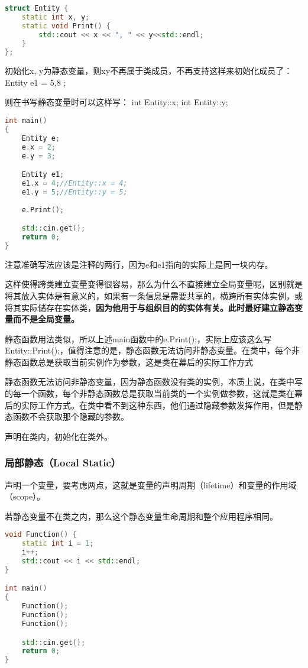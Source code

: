 \begin{lstlisting}[language=c++]
struct Entity {
    static int x, y;
    static void Print() {
        std::cout << x << ", " << y<<std::endl;
    }
};
\end{lstlisting}

初始化{\ncodestyle x}, {\ncodestyle y}为静态变量，则xy不再属于类成员，不再支持这样来初始化成员了：{\ncodestyle Entity e1 = { 5,8 };}

则在书写静态变量时可以这样写：
int Entity::x;
int Entity::y;


\begin{lstlisting}[language=c++]
int main()
{
    Entity e;
    e.x = 2;
    e.y = 3;

    Entity e1;
    e1.x = 4;//Entity::x = 4;
    e1.y = 5;//Entity::y = 5;
    
    e.Print();

    std::cin.get();
    return 0;
}
\end{lstlisting}

注意准确写法应该是注释的两行，因为{\ncodestyle e}和{\ncodestyle e1}指向的实际上是同一块内存。

这样使得跨类建立变量变得很容易，那么为什么不直接建立全局变量呢，区别就是将其放入实体是有意义的，如果有一条信息是需要共享的，横跨所有实体实例，或将其实际储存在实体类，\textbf{因为他用于与组织目的的实体有关。此时最好建立静态变量而不是全局变量。}

静态函数用法类似，所以上述main函数中的{\ncodestyle e.Print();}，实际上应该这么写{\ncodestyle Entity::Print();}，值得注意的是，静态函数无法访问非静态变量。在类中，每个非静态函数总是获取当前实例作为参数，这是类在幕后的实际工作方式

静态函数无法访问非静态变量，因为静态函数没有类的实例，本质上说，在类中写的每一个函数，每个非静态函数总是获取当前类的一个实例做参数，这就是类在幕后的实际工作方式。在类中看不到这种东西，他们通过隐藏参数发挥作用，但是静态函数不会获取那个隐藏的参数。

声明在类内，初始化在类外。

\subsubsection{局部静态（Local Static）}

声明一个变量，要考虑两点，这就是变量的声明周期（lifetime）和变量的作用域（scope）。

若静态变量不在类之内，那么这个静态变量生命周期和整个应用程序相同。

\begin{lstlisting}[language=c++]
void Function() {
    static int i = 1;
    i++;
    std::cout << i << std::endl;
}

int main()
{
    Function();
    Function();
    Function();

    std::cin.get();
    return 0;
}
\end{lstlisting}

